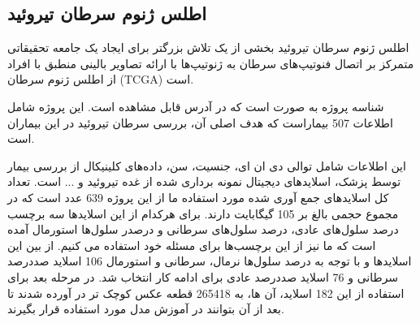 \subsection{اطلس ژنوم سرطان تیروئید}\label{subsec:موسسه-ملی-سرطان-پورتال-داده-های-مشترک-ژنومیک}

اطلس ژنوم سرطان تیروئید بخشی از یک تلاش بزرگتر برای ایجاد یک جامعه تحقیقاتی متمرکز بر اتصال فنوتیپ‌های سرطان به ژنوتیپ‌ها با ارائه تصاویر بالینی منطبق با افراد از اطلس ژنوم سرطان (TCGA) است.\cite{clark2013cancer}

شناسه پروژه به صورت  است که در آدرس \cite{ncigdc} قابل مشاهده است. این پروژه شامل اطلاعات 507 بیماراست که هدف اصلی آن، بررسی سرطان تیروئید در این بیماران است.

این اطلاعات شامل توالی دی ان ای، جنسیت، سن، داده‌های کلینیکال از بررسی بیمار توسط پزشک، اسلایدهای دیجیتال نمونه برداری شده از غده تیروئید و ... است.
تعداد کل اسلاید‌های جمع آوری شده مورد استفاده ما از این پروژه 639 عدد است که در مجموع حجمی بالغ بر 105 گیگابایت دارند. برای هرکدام از این اسلاید‌ها سه برچسب درصد سلول‌های عادی، درصد سلول‌های سرطانی و درصدر سلول‌ها استورمال آمده است که ما نیز از این برچسب‌ها برای مسئله خود استفاده می کنیم. از بین این اسلاید‌ها و با توجه به درصد سلول‌ها نرمال، سرطانی و استورمال 106 اسلاید صددرصد سرطانی و 76 اسلاید صددرصد عادی برای ادامه کار انتخاب شد.
در مرحله بعد برای استفاده از این 182 اسلاید، آن ها، به 265418 قطعه عکس کوچک تر در آورده شدند تا بعد از آن بتوانند در آموزش مدل مورد استفاده قرار بگیرند. 